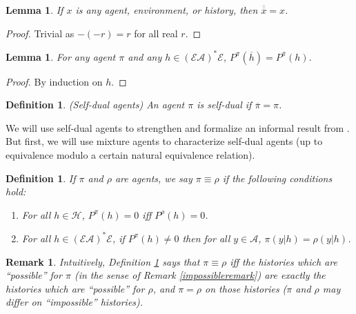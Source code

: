 \documentclass[twoside]{article}
\newtheorem{definition}[theorem]{Definition}
\newtheorem{remark}[theorem]{Remark}
\newtheorem{lemma}[theorem]{Lemma}
\begin{document}
\begin{lemma}
\label{doublenegationlemma}
    If $x$ is any agent, environment, or history,
    then $\overline{\overline x}=x$.
\end{lemma}

\begin{proof}
    Trivial as $-(-r)=r$ for all real $r$.
\end{proof}

\begin{lemma}
\label{asteriskcommuteswithoverlinelemma}
    For any agent $\pi$ and any $h\in(\mathcal E\mathcal A)^*\mathcal E$,
    $P^\pi(\overline h)=P^{\overline{\pi}}(h)$.
\end{lemma}

\begin{proof}
    By induction on $h$.
\end{proof}

\begin{definition}
    (Self-dual agents)
    An agent $\pi$ is \emph{self-dual} if $\overline{\pi}=\pi$.
\end{definition}

We will use self-dual agents to strengthen and formalize an informal result
from \cite{alexander2021reward}.
But first, we will use mixture agents to characterize
self-dual agents (up to equivalence modulo a certain natural equivalence relation).

\begin{definition}
\label{equivdefn}
    If $\pi$ and $\rho$ are agents, we say $\pi\equiv\rho$ if the
    following conditions hold:
    \begin{enumerate}
        \item For all $h\in\mathcal H$, $P^\pi(h)=0$ iff $P^\rho(h)=0$.
        \item For all $h\in(\mathcal E\mathcal A)^*\mathcal E$,
            if $P^\pi(h)\not=0$ then for all $y\in\mathcal A$,
            $\pi(y|h)=\rho(y|h)$.
    \end{enumerate}
\end{definition}

\begin{remark}
    Intuitively, Definition \ref{equivdefn} says that $\pi\equiv\rho$
    iff the histories which are ``possible'' for $\pi$ (in the sense of
    Remark \ref{impossibleremark}) are exactly the histories which are
    ``possible'' for $\rho$, and $\pi=\rho$ on those histories
    ($\pi$ and $\rho$ may differ on ``impossible'' histories).
\end{remark}
\end{document}
